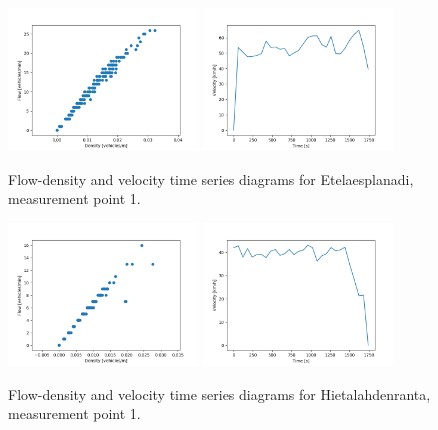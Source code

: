\documentclass[english, 12pt, a4paper, elec, utf8, pdfa, online]{aaltothesis}
\begin{document}
\clearpage
\begin{figure}[ht!]
    \centering
    \includegraphics[width=0.45\textwidth]{graphs/Etelaesplanadi_1_flw_dns.png}
    \includegraphics[width=0.45\textwidth]{graphs/Etelaesplanadi_1_spd_time_6.png}
    \caption{Flow-density and velocity time series diagrams for Etelaesplanadi, measurement point 1.}
\end{figure}
\begin{figure}[ht!]
    \centering
    \includegraphics[width=0.45\textwidth]{graphs/Hietalahdenranta_1_flw_dns.png}
    \includegraphics[width=0.45\textwidth]{graphs/Hietalahdenranta_1_spd_time_6.png}
    \caption{Flow-density and velocity time series diagrams for Hietalahdenranta, measurement point 1.}
\end{figure}
\end{document}
